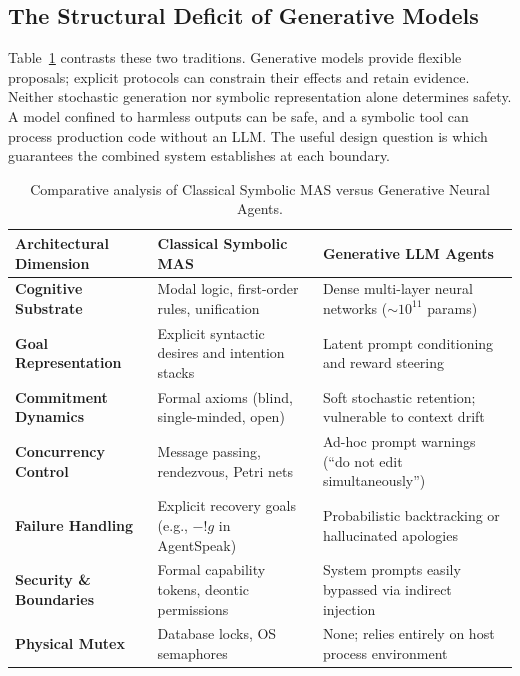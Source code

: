 \documentclass[11pt,a4paper]{article}
\begin{document}
\subsection{The Structural Deficit of Generative Models}

Table~\ref{tab:lineage-comparison} contrasts these two traditions. Generative
models provide flexible proposals; explicit protocols can constrain their effects
and retain evidence. Neither stochastic generation nor symbolic representation
alone determines safety. A model confined to harmless outputs can be safe, and
a symbolic tool can process production code without an LLM. The useful design
question is which guarantees the combined system establishes at each boundary.

\begin{table}[H]
\centering
\small
\begin{tabularx}{\textwidth}{l >{\raggedright\arraybackslash}X >{\raggedright\arraybackslash}X}
\toprule
\textbf{Architectural Dimension} & \textbf{Classical Symbolic MAS} & \textbf{Generative LLM Agents} \\
\midrule
\textbf{Cognitive Substrate} & Modal logic, first-order rules, unification & Dense multi-layer neural networks ($\sim 10^{11}$ params) \\
\textbf{Goal Representation} & Explicit syntactic desires and intention stacks & Latent prompt conditioning and reward steering \\
\textbf{Commitment Dynamics} & Formal axioms (blind, single-minded, open) & Soft stochastic retention; vulnerable to context drift \\
\textbf{Concurrency Control} & Message passing, rendezvous, Petri nets & Ad-hoc prompt warnings (``do not edit simultaneously'') \\
\textbf{Failure Handling} & Explicit recovery goals (e.g., $-!g$ in AgentSpeak) & Probabilistic backtracking or hallucinated apologies \\
\textbf{Security \& Boundaries} & Formal capability tokens, deontic permissions & System prompts easily bypassed via indirect injection \\
\textbf{Physical Mutex} & Database locks, OS semaphores & None; relies entirely on host process environment \\
\bottomrule
\end{tabularx}
\caption{Comparative analysis of Classical Symbolic MAS versus Generative Neural Agents.}
\label{tab:lineage-comparison}
\end{table}
\end{document}
